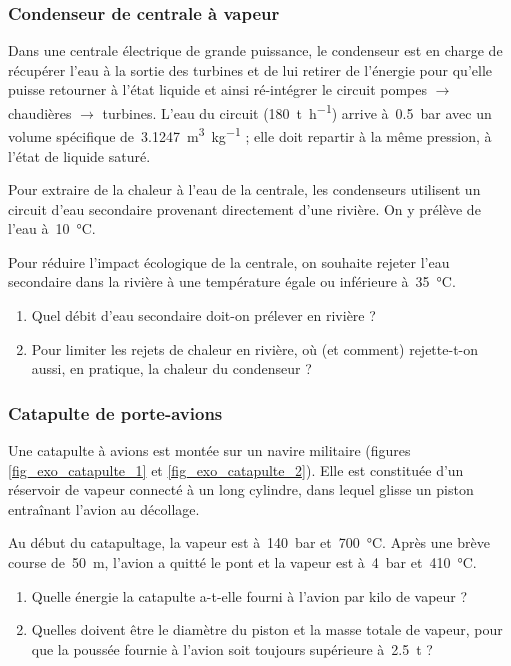 \subsubsection{Condenseur de centrale à vapeur}
\label{exo_condenseur_riviere}

	Dans une centrale électrique de grande puissance, le condenseur est en charge de récupérer l’eau à la sortie des turbines et de lui retirer de l’énergie pour qu’elle puisse retourner à l’état liquide et ainsi ré-intégrer le circuit pompes $\to$ chaudières $\to$ turbines. L’eau du circuit (\SI{180}{\tonne\per\hour}) arrive à~\SI{0,5}{\bar} avec un volume spécifique de~\SI{3,1247}{\metre\cubed\per\kilogram} ; elle doit repartir à la même pression, à l’état de liquide saturé.
	
	Pour extraire de la chaleur à l’eau de la centrale, les condenseurs utilisent un circuit d’eau secondaire provenant directement d’une rivière. On y prélève de l’eau à~\SI{10}{\degreeCelsius}.
	
	Pour réduire l’impact écologique de la centrale, on souhaite rejeter l’eau secondaire dans la rivière à une température égale ou inférieure à~\SI{35}{\degreeCelsius}.
	
	\begin{enumerate}
		\item Quel débit d’eau secondaire doit-on prélever en rivière ?
		\item Pour limiter les rejets de chaleur en rivière, où (et comment) rejette-t-on aussi, en pratique, la chaleur du condenseur ?
	\end{enumerate}
	

\subsubsection{Catapulte de porte-avions}
\label{exo_catapulte}

	Une catapulte à avions est montée sur un navire militaire (figures \ref{fig_exo_catapulte_1} et \ref{fig_exo_catapulte_2}). Elle est constituée d’un réservoir de vapeur connecté à un long cylindre, dans lequel glisse un piston entraînant l’avion au décollage.
	
	Au début du catapultage, la vapeur est à~\SI{140}{\bar} et~\SI{700}{\degreeCelsius}. Après une brève course de~\SI{50}{\metre}, l’avion a quitté le pont et la vapeur est à~\SI{4}{\bar} et~\SI{410}{\degreeCelsius}.
	
	\begin{enumerate}
		\item Quelle énergie la catapulte a-t-elle fourni à l’avion par kilo de vapeur ?
		\item Quelles doivent être le diamètre du piston et la masse totale de vapeur, pour que la poussée fournie à l’avion soit toujours supérieure à~\SI{2,5}{\tonne} ?
	\end{enumerate}
	
